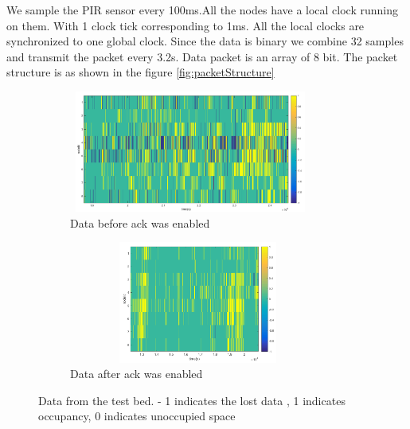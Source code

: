  We sample the PIR sensor every 100ms.All the nodes have a local clock running on them. With 1 clock tick corresponding to 1ms. All the local clocks are synchronized to one global clock. Since the data is binary we combine 32 samples and transmit the packet every 3.2s. 
Data packet is an array of 8 bit. The packet structure is as shown in the figure \ref{fig:packetStructure}\\


\begin{figure}
    \centering
    \begin{subfigure}[b]{1\textwidth}
        \centering
        \includegraphics[width=8cm,height=4cm]{./pics/packetLoss.png}
      \caption{Data before ack was enabled}
    \end{subfigure}
    \hfill
    \begin{subfigure}[b]{1\textwidth}
        \centering
        \includegraphics[width=8.5cm,height=4cm]{./pics/dataAfterAck.png}
        \caption{Data after ack was enabled}
    \end{subfigure}
\caption{Data from the test bed. - 1 indicates the lost data , 1 indicates occupancy, 0 indicates unoccupied space}
\label{fig:packetLoss}
\end{figure}

